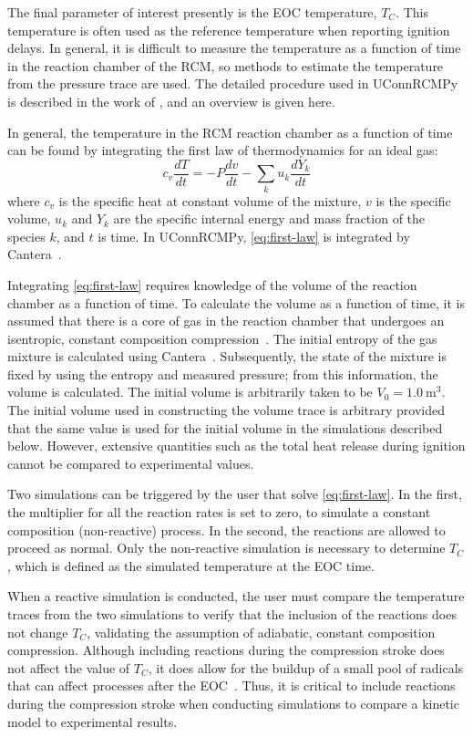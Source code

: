 \documentclass[12pt]{../ussci}
\begin{document}
The final parameter of interest presently is the EOC temperature, \(T_C\). This
temperature is often used as the reference temperature when reporting ignition
delays. In general, it is difficult to measure the temperature as a function of
time in the reaction chamber of the RCM, so methods to estimate the temperature
from the pressure trace are used. The detailed procedure used in UConnRCMPy is
described in the work of \textcite{Dames2016}, and an overview is given here.

In general, the temperature in the RCM reaction chamber as a function of time
can be found by integrating the first law of thermodynamics for an ideal gas:
%
\begin{equation} \label{eq:first-law}
    c_v \frac{dT}{dt} = -P \frac{dv}{dt} - \sum_k u_k \frac{d Y_k}{dt}
\end{equation}
%
where \(c_v\) is the specific heat at constant volume of the mixture, \(v\) is
the specific volume, \(u_k\) and \(Y_k\) are the specific internal energy and
mass fraction of the species \(k\), and \(t\) is time. In UConnRCMPy,
\cref{eq:first-law} is integrated by Cantera~\autocite{cantera}.

Integrating \cref{eq:first-law} requires knowledge of the volume of the reaction
chamber as a function of time. To calculate the volume as a function of time, it
is assumed that there is a core of gas in the reaction chamber that undergoes an
isentropic, constant composition compression~\autocite{Lee1998}. The initial
entropy of the gas mixture is calculated using Cantera~\autocite{cantera}.
Subsequently, the state of the mixture is fixed by using the entropy and
measured pressure; from this information, the volume is calculated. The initial
volume is arbitrarily taken to be \(V_0=\SI{1.0}{\m\cubed}\). The initial volume
used in constructing the volume trace is arbitrary provided that the same value
is used for the initial volume in the simulations described below. However,
extensive quantities such as the total heat release during ignition cannot be
compared to experimental values.

Two simulations can be triggered by the user that solve \cref{eq:first-law}. In
the first, the multiplier for all the reaction rates is set to zero, to simulate
a constant composition (non-reactive) process. In the second, the reactions are
allowed to proceed as normal. Only the non-reactive simulation is necessary to
determine \(T_C\), which is defined as the simulated temperature at the EOC
time.

When a reactive simulation is conducted, the user must compare the
temperature traces from the two simulations to verify that the inclusion
of the reactions does not change \(T_C\), validating the assumption of
adiabatic, constant composition compression. Although including
reactions during the compression stroke does not affect the value of
\(T_C\), it does allow for the buildup of a small pool of radicals that
can affect processes after the EOC~\autocite{Mittal2008}. Thus, it is
critical to include reactions during the compression stroke when
conducting simulations to compare a kinetic model to experimental
results.
\end{document}
